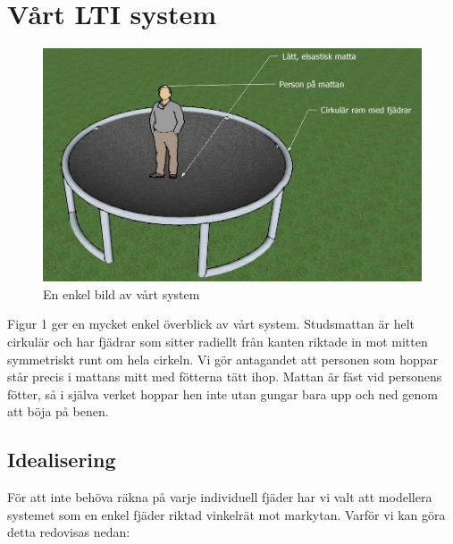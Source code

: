 \documentclass[10pt,a4paper]{article}
\begin{document}
\newpage
\section{Vårt LTI system}

\begin{figure}[ht]
\begin{center}
\includegraphics[scale=0.62]{Bild2}
\caption{En enkel bild av vårt system}
\end{center}
\end{figure}

Figur 1 ger en mycket enkel överblick av vårt system. Studsmattan är helt cirkulär och har fjädrar som sitter radiellt från kanten riktade in mot mitten symmetriskt runt om hela cirkeln. Vi gör antagandet att personen som hoppar står precis i mattans mitt med fötterna tätt ihop. Mattan är fäst vid personens fötter, så i själva verket hoppar hen inte utan gungar bara upp och ned genom att böja på benen.

\subsection{Idealisering}
För att inte behöva räkna på varje individuell fjäder har vi valt att modellera systemet som en enkel fjäder riktad vinkelrät mot markytan. Varför vi kan göra detta redovisas nedan:
\end{document}
